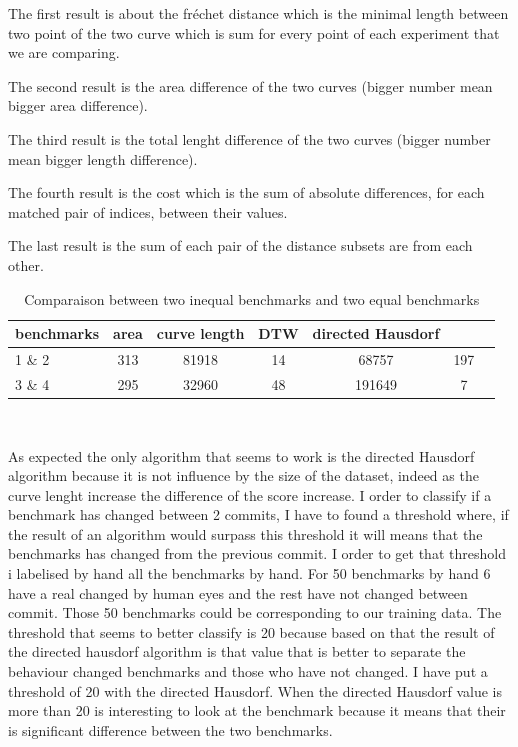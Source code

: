 \documentclass{article}
\begin{document}
The first result is about the fréchet distance which is the minimal length  between two point of the two curve which is sum  for every point of each experiment that we are comparing.

The second result is the area difference of the two curves (bigger number mean bigger area difference).

The third result is the total lenght difference of the two curves (bigger number mean bigger length difference).

The fourth result is the cost which is the sum of absolute differences, for each matched pair of indices, between their values.

The last result is the sum of each pair of the distance subsets are from each other.

\begin{table}[h!]
\begin{tabular}{|l|c|c|c|c|c|c|}
   \hline
   benchmarks  & area & curve length & DTW & directed Hausdorf \\
   \hline
   1 \&  2 & 313 & 81918 & 14 & 68757 & 197\\
   \hline
   3 \& 4  & 295 & 32960 & 48 & 191649 & 7 \\
   \hline
\end{tabular} \\ 
\caption{Comparaison between two inequal benchmarks and two equal benchmarks}
\end{table}


As expected the only algorithm that seems to work is the directed Hausdorf algorithm because it is not influence by the size of the dataset, indeed as the curve lenght increase the difference of the score increase. 
I order to classify if a benchmark has changed between 2 commits, I have to found a threshold where, if the result of an algorithm would surpass this threshold it will means that the benchmarks has changed from the previous commit. I order to get that threshold i labelised by hand all the benchmarks by hand. For 50 benchmarks by hand 6 have a real changed by human eyes and the rest have not changed between commit. Those 50 benchmarks could be corresponding to our training data. The threshold that seems to better classify is 20 because based on that the result of the directed hausdorf algorithm is that value that is better to separate the behaviour changed benchmarks and those who have not changed.
I have put a threshold of 20 with the directed Hausdorf. When the directed Hausdorf value is more than 20 is interesting to look at the benchmark because it means that their is significant difference between the two benchmarks.
\end{document}
